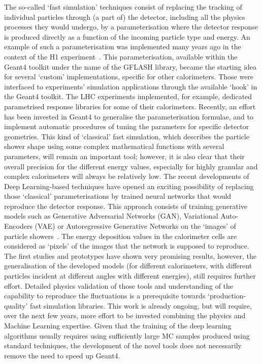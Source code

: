 \documentclass[11pt,a4paper]{article}
\begin{document}
The so-called `fast simulation' techniques consist of replacing the
tracking of individual particles through (a part of) the detector,
including all the physics processes they would undergo, by a
parameterisation where the detector response is produced directly as a
function of the incoming particle type and energy. An example of such a
parameterisation was implemented many years ago in the context of the H1
experiment~\cite{H1Gflash}. This parameterisation, available within the
Geant4 toolkit under the name of the GFLASH library, became the starting
idea for several `custom' implementations, specific for other
calorimeters. Those were interfaced to experiments' simulation
applications through the available `hook' in the Geant4 toolkit. The LHC
experiments implemented, for example, dedicated parametrised response
libraries for some of their calorimeters. Recently, an effort has been
invested in Geant4 to generalise the parameterisation formulae, and to
implement automatic procedures of tuning the parameters for specific
detector geometries. This kind of `classical' fast simulation, which
describes the particle shower shape using some complex mathematical
functions with several parameters, will remain an important tool;
however, it is also clear that their overall precision for the different
energy values, especially for highly granular and complex calorimeters
will always be relatively low. The recent developments of Deep
Learning-based techniques have opened an exciting possibility of
replacing those `classical' parameterisations by trained neural networks
that would reproduce the detector response. This approach consists of
training generative models such as Generative Adversarial Networks
(GAN), Variational Auto-Encoders (VAE) or Autoregressive Generative
Networks on the `images' of particle 
showers~\cite{ML001-GAN, aishik_ghosh_2019_3599705, GAN-ATLAS}. The energy
deposition values in the calorimeter cells are considered as `pixels' of
the images that the network is supposed to reproduce. The first studies
and prototypes have shown very promising results, however, the
generalisation of the developed models (for different calorimeters, with
different particles incident at different angles with different
energies), still requires further effort. Detailed physics validation of
those tools and understanding of the capability to reproduce the
fluctuations is a prerequisite towards `production-quality' fast
simulation libraries. This work is already ongoing, but will require,
over the next few years, more effort to be invested combining the
physics and Machine Learning expertise. Given that the training of the
deep learning algorithms usually requires using sufficiently large MC
samples produced using standard techniques, the development of the novel
tools does not necessarily remove the need to speed up Geant4.
\end{document}
